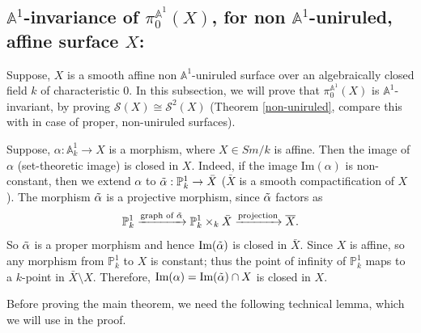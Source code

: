 \documentclass[11pt, reqno]{amsart}
\theoremstyle{plain}
\theoremstyle{definition}
\newcommand{\sS}{{\mathcal S}}
\newcommand{\A}{{\mathbb A}}
\begin{document}
	\subsection{$\A^1$-invariance of $\pi_0^{\A^1}(X)$, for non $\A^1$-uniruled, affine surface $X$:}
	
	Suppose, $X$ is a smooth affine non $\A^1$-uniruled surface over an algebraically closed field $k$ of characteristic $0$. In this subsection, we will prove that $\pi_0^{\A^1}(X)$ is $\A^1$-invariant, by proving $\sS(X) \cong \sS^2(X)$ (Theorem \ref{non-uniruled}, compare this with \cite[Theorem 3.14]{bhs} in case of proper, non-uniruled surfaces).

Suppose, $\alpha: \A^1_k \to X$ is a morphism, where $X \in Sm/k$ is affine. Then the image of $\alpha$ (set-theoretic image) is closed in $X$. Indeed, if the image $\text{Im}(\alpha)$ is non-constant, then we extend $\alpha$ to $\Tilde{\alpha}: \mathbb{P}^1_k \to \bar{X}$ ($\bar{X}$ is a smooth compactification of $X$). The morphism $\Tilde{\alpha}$ is a projective morphism, since $\Tilde{\alpha}$ factors as
$$\mathbb{P}^1_k \xrightarrow{\text{graph of } \Tilde{\alpha}} \mathbb{P}^1_k \times_k \bar{X} \xrightarrow{\text{projection}} \overline{X}.$$
So $\Tilde{\alpha}$ is a proper morphism and hence $\text{Im}(\Tilde{\alpha})$ is closed in $\bar{X}$. Since $X$ is affine, so any morphism from $\mathbb{P}^1_k$ to $X$ is constant; thus the point of infinity of $\mathbb{P}^1_k$ maps to a $k$-point in $\bar{X} \setminus X$. Therefore, $\text{Im}(\alpha) = \text{Im}(\Tilde{\alpha}) \cap X$ is closed in $X$. 

 Before proving the main theorem, we need the following technical lemma, which we will use in the proof.


\end{document}
